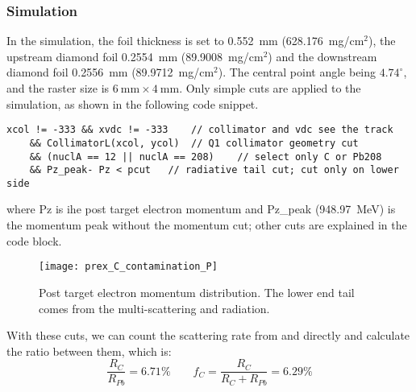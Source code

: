 \subsubsection{Simulation}
In the simulation, the \Pb foil thickness is set to 0.552~mm (628.176~mg/$\mathrm{cm}^2$), 
the upstream diamond foil 0.2554~mm (89.9008~mg/$\mathrm{cm}^2$) and the downstream diamond 
foil 0.2556~mm (89.9712~mg/$\mathrm{cm}^2$). The central point angle being $4.74^\circ$,
and the raster size is $6\ \mathrm{mm} \times 4\ \mathrm{mm}$. 
Only simple cuts are applied to the simulation, as shown in the following code
snippet.
\begin{lstlisting}[style=C]
    xcol != -333 && xvdc != -333    // collimator and vdc see the track
    && CollimatorL(xcol, ycol)	// Q1 collimator geometry cut
    && (nuclA == 12 || nuclA == 208)	// select only C or Pb208
    && Pz_peak- Pz < pcut	// radiative tail cut; cut only on lower side
\end{lstlisting}
where Pz is ihe post target electron momentum and Pz\_peak (948.97~MeV) 
is the momentum peak without the momentum cut; other cuts are explained in the
code block. 

\begin{figure}[H]
    \centering
    \texttt{[image: prex\_C\_contamination\_P]}
    \caption{Post target electron momentum distribution. The lower end tail comes 
    from the multi-scattering and radiation.}
\end{figure}

With these cuts, we can count the scattering rate from \C and \Pb directly 
and calculate the ratio between them, which is:
\begin{equation}
    \frac{R_C}{R_{Pb}} = 6.71\%	\qquad f_C = \frac{R_C}{R_C + R_{Pb}} = 6.29\%
\end{equation}

